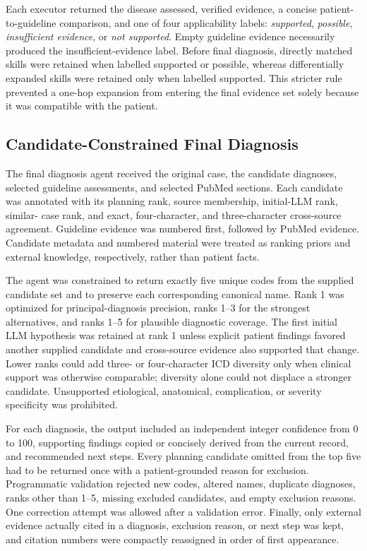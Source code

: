 \documentclass[10pt,letterpaper]{article}
\begin{document}
Each executor returned the disease assessed, verified evidence, a concise
patient-to-guideline comparison, and one of four applicability labels:
\emph{supported}, \emph{possible}, \emph{insufficient evidence}, or
\emph{not supported}. Empty guideline evidence necessarily produced the
insufficient-evidence label. Before final diagnosis, directly matched skills were
retained when labelled supported or possible, whereas differentially expanded
skills were retained only when labelled supported. This stricter rule prevented
a one-hop expansion from entering the final evidence set solely because it was
compatible with the patient.

\subsection{Candidate-Constrained Final Diagnosis}

The final diagnosis agent received the original case, the candidate diagnoses,
selected guideline assessments, and selected PubMed sections. Each candidate was
annotated with its planning rank, source membership, initial-LLM rank, similar-
case rank, and exact, four-character, and three-character cross-source agreement.
Guideline evidence was numbered first, followed by PubMed evidence. Candidate
metadata and numbered material were treated as ranking priors and external
knowledge, respectively, rather than patient facts.

The agent was constrained to return exactly five unique codes from the supplied
candidate set and to preserve each corresponding canonical name. Rank 1 was
optimized for principal-diagnosis precision, ranks 1--3 for the strongest
alternatives, and ranks 1--5 for plausible diagnostic coverage. The first initial
LLM hypothesis was retained at rank 1 unless explicit patient findings favored
another supplied candidate and cross-source evidence also supported that change.
Lower ranks could add three- or four-character ICD diversity only when clinical
support was otherwise comparable; diversity alone could not displace a stronger
candidate. Unsupported etiological, anatomical, complication, or severity
specificity was prohibited.

For each diagnosis, the output included an independent integer confidence from 0
to 100, supporting findings copied or concisely derived from the current record,
and recommended next steps. Every planning candidate omitted from the top five
had to be returned once with a patient-grounded reason for exclusion. Programmatic
validation rejected new codes, altered names, duplicate diagnoses, ranks other
than 1--5, missing excluded candidates, and empty exclusion reasons. One
correction attempt was allowed after a validation error. Finally, only external
evidence actually cited in a diagnosis, exclusion reason, or next step was kept,
and citation numbers were compactly reassigned in order of first appearance.
\end{document}
